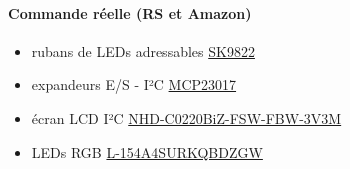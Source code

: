 \documentclass[12pt]{report}
\begin{document}
	\paragraph{Commande réelle (RS et Amazon)}
	\begin{itemize}[label=$-$]
		\item rubans de LEDs adressables \href{https://fr.aliexpress.com/item/1005006918408592.html?spm=a2g0o.productlist.main.19.fbb0788296kxRo&algo_pvid=72d2c9a9-ec47-4e4b-9d14-7e90be35485c&algo_exp_id=72d2c9a9-ec47-4e4b-9d14-7e90be35485c-9&pdp_npi=4%40dis!EUR!18.92!18.92!!!145.68!145.68!%402103888a17169934968957029e0b2f!12000038723750387!sea!FR!0!AB&curPageLogUid=lAauznpLAY1Y&utparam-url=scene%3Asearch%7Cquery_from%3A}{SK9822}
		\item expandeurs E/S - I²C \href{https://fr.farnell.com/microchip/mcp23017-e-sp/16-bit-expander-i-o-i2c-i-f/dp/1332088}{MCP23017}
		\item écran LCD I²C \href{https://fr.rs-online.com/web/p/afficheurs-monochromes-lcd/2644045?searchId=b08a66da-698d-420f-a525-b4944d7ccd96&gb=s}{NHD-C0220BiZ-FSW-FBW-3V3M}\\
		\item LEDs RGB \href{https://fr.rs-online.com/web/p/leds/1651767?gb=s}{L-154A4SURKQBDZGW}
	\end{itemize}
\end{document}
